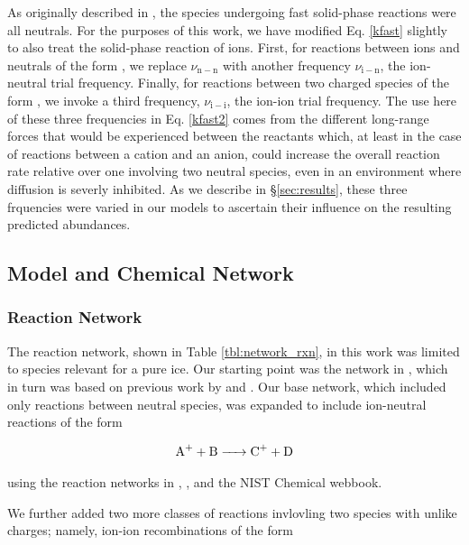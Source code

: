 \documentclass[journal=aesccq,manuscript=draft]{achemso}
\begin{document}
As originally described in \citet{shingledecker_simulating_2019}, the species undergoing fast solid-phase reactions were all neutrals. For the purposes of this work, we have modified Eq. \eqref{kfast} slightly to also treat the solid-phase reaction of ions. First, for reactions between ions and neutrals of the form , we replace $\nu_\mathrm{n-n}$ with another frequency $\nu_\mathrm{i-n}$, the ion-neutral trial frequency. Finally, for reactions between two charged species of the form , we invoke a third frequency, $\nu_\mathrm{i-i}$, the ion-ion trial frequency. The use here of these three frequencies in Eq. \eqref{kfast2} comes from the different long-range forces that would be experienced between the reactants which, at least in the case of reactions between a cation and an anion, could increase the overall reaction rate relative over one involving two neutral species, even in an environment where diffusion is severly inhibited. As we describe in \S\ref{sec:results}, these three frquencies were varied in our models to ascertain their influence on the resulting predicted abundances.

\subsection{Model and Chemical Network}

\subsubsection{Reaction Network}

The reaction network, shown in Table \ref{tbl:network_rxn}, in this work was limited to species relevant for a pure  ice. Our starting point was the network in \citet{mullikin_new_2021}, which in turn was based on previous work by \citet{shingledecker_simulating_2019} and \citet{shingledecker_new_2017}. Our base network, which included only reactions between neutral species, was expanded to include ion-neutral reactions of the form

\begin{equation}
    \ce{A+ + B -> C+ + D}
\end{equation}

\noindent
using the reaction networks in \citet{pastina_effect_2001}, \citet{anicich_index_2003}, and the NIST Chemical webbook.

We further added two more classes of reactions invlovling two species with unlike charges; namely, ion-ion recombinations of the form
\end{document}
